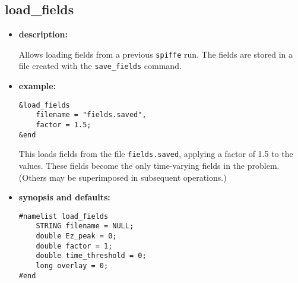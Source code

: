 %
\newpage

\subsection{load\_fields}

\begin{itemize}

\item {\bf description:}

Allows loading fields from a previous {\tt spiffe} run.  The fields
are stored in a file created with the {\tt save\_fields} command.

\item {\bf example:} 
\begin{verbatim}
&load_fields
    filename = "fields.saved",
    factor = 1.5;
&end
\end{verbatim}
This loads fields from the file {\tt fields.saved}, applying a factor
of 1.5 to the values.  These fields become the only time-varying
fields in the problem.  (Others may be superimposed in subsequent
operations.)


\item {\bf synopsis and defaults:} 
\begin{verbatim}
#namelist load_fields
    STRING filename = NULL;
    double Ez_peak = 0;
    double factor = 1;
    double time_threshold = 0;
    long overlay = 0;
#end
\end{verbatim}


\end{itemize}
